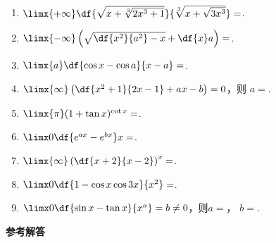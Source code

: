 \begin{enumerate}
	\item $\limx{+\infty}\df{\sqrt{x+\sqrt[3]{2x^3+1}}}{\sqrt[3]
	{x+\sqrt{3x^3}}}=$\uline{\hspace*{3cm}}.
	\item $\limx{-\infty}\left(\sqrt{\df{x^2}{a^2}-x}
	+\df{x}a\right)=$\uline{\hspace*{3cm}}.
	\item $\limx{a}\df{\cos x-\cos a}{x-a}=$\uline{\hspace*{3cm}}.
	\item $\limx{\infty}\left(\df{x^2+1}{2x-1}+ax-b\right)=0$，则
	$a=$\uline{\hspace*{3cm}}.
	\item $\limx{\pi}(1+\tan x)^{\cot x}=$\uline{\hspace*{3cm}}.
	\item $\limx0\df{e^{ax}-e^{bx}}x=$\uline{\hspace*{3cm}}.
	\item $\limx{\infty}\left(\df{x+2}{x-2}\right)^x=$\uline{\hspace*{3cm}}.
	\item $\limx0\df{1-\cos x\cos 3x}{x^2}=$\uline{\hspace*{3cm}}.
	\item $\limx0\df{\sin x-\tan x}{x^a}=b\ne 0$，则$a=$\uline{\hspace*{3cm}}，
	$b=$\uline{\hspace*{3cm}}.
\end{enumerate}

\newpage

\begin{center}
	\Large\bf
	参考解答
\end{center}

